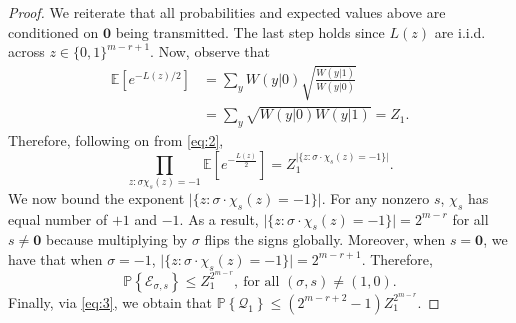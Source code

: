 \documentclass[conference,letterpaper]{IEEEtran}
\newcommand{\cE}{\ensuremath{\mathcal{E}}}
\newcommand{\cQ}{\ensuremath{\mathcal{Q}}}
\newcommand{\PR}[1]{{\mathbb{P}}\left\{ #1\right\}}
\newcommand{\E}[1]{\mathbb{E}\left[ #1\right]}
\begin{document}
\begin{proof}
We reiterate that all probabilities and expected values above are conditioned on $\mathbf{0}$ being transmitted. The last step holds since $L(z)$ are i.i.d. across $z\in \{0,1\}^{m-r+1}$.
Now, observe that 
\begin{align*}
\E{e^{-L(z)/2}}
    &= \sum_{y} W(y|0) \sqrt{\frac{W(y|1)}{W(y|0)}} \\
    &= \sum_{y} \sqrt{W(y|0) W(y|1)} = Z_1.
\end{align*}
Therefore, following on from \eqref{eq:2},
\begin{equation*}
    \prod_{z : \sigma \chi_s(z) = -1} \E{ e^{- \frac{L(z)}{2}}} = Z_1^{\lvert\{z : \sigma\cdot \chi_s(z)=-1\}\rvert }.
\end{equation*}
We now bound the exponent ${\lvert\{z : \sigma\cdot \chi_s(z)=-1\}\rvert}$. 
For any nonzero $s$, $\chi_s$ has equal number of $+1 $ and $-1$. As a result, ${\lvert\{z : \sigma\cdot \chi_s(z)=-1\}\rvert}  = 2^{m-r}$ for all $ s\neq \mathbf{0}$ because multiplying by $\sigma$ flips the signs globally. Moreover, when $ s = \mathbf{0} $, we have that when $ \sigma = -1 $, ${\lvert\{z : \sigma \cdot \chi_s(z)=-1\}\rvert} = 2^{m-r+1}$. Therefore, 
\begin{equation*}
    \PR{\cE_{\sigma,s}}\le Z_1^{2^{m-r}}, \ \text{for all } (\sigma,s) \neq (1,0).
\end{equation*}
Finally, via \eqref{eq:3}, we obtain that
$
        \PR{\cQ_1}  \leq (2 ^ { m -r + 2  } - 1 ) Z_1^{2^{m-r}}.
$
\end{proof}
\end{document}
